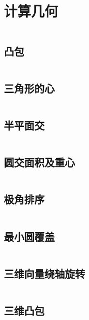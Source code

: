\chapter{计算几何}

\inputminted{cpp}{\source/computational-geometry/2d/basis.cpp}
\section{凸包}
\inputminted{cpp}{\source/computational-geometry/2d/convex.cpp}
\section{三角形的心}
\inputminted{cpp}{\source/computational-geometry/2d/triangle.cpp}
\section{半平面交}
\inputminted{cpp}{\source/computational-geometry/2d/half-plane-intersection.cpp}
\section{圆交面积及重心}
\inputminted{cpp}{\source/computational-geometry/2d/circles-intersections.cpp}
\section{极角排序}
\inputminted{cpp}{\source/computational-geometry/2d/angle_sort.cpp}
\section{最小圆覆盖}
\inputminted{cpp}{\source/computational-geometry/2d/circle_mincover.cpp}

\section{三维向量绕轴旋转}
\inputminted{cpp}{\source/computational-geometry/3d/basis.cpp}
\section{三维凸包}
\inputminted{cpp}{\source/computational-geometry/3d/convex.cpp}
